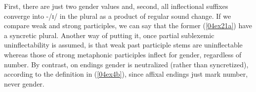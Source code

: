 \documentclass[output=paper,colorlinks,citecolor=brown]{langscibook}
\begin{document}
\bigskip

First, there are just two gender values and, second, all inflectional suffixes converge into -/ɪ/ in the plural as a product of regular sound change. If we compare weak and strong participles, we can say that the former (\ref{04ex21a}) have a syncretic plural. Another way of putting it, once partial sublexemic uninflectability is assumed, is that weak past participle stems are uninflectable whereas those of strong metaphonic participles inflect for gender, regardless of number. By contrast, on endings gender is neutralized (rather than syncretized), according to the definition in (\ref{04ex4b}), since affixal endings just mark number, never gender.


\end{document}
